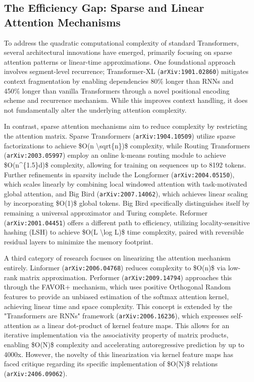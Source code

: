 \documentclass[11pt]{article}
\begin{document}
\subsection{The Efficiency Gap: Sparse and Linear Attention Mechanisms}

To address the quadratic computational complexity of standard Transformers, several architectural innovations have emerged, primarily focusing on sparse attention patterns or linear-time approximations. One foundational approach involves segment-level recurrence; Transformer-XL (\texttt{arXiv:1901.02860}) mitigates context fragmentation by enabling dependencies 80\% longer than RNNs and 450\% longer than vanilla Transformers through a novel positional encoding scheme and recurrence mechanism. While this improves context handling, it does not fundamentally alter the underlying attention complexity.

In contrast, sparse attention mechanisms aim to reduce complexity by restricting the attention matrix. Sparse Transformers (\texttt{arXiv:1904.10509}) utilize sparse factorizations to achieve \$O(n \textbackslash{}sqrt\{n\})\$ complexity, while Routing Transformers (\texttt{arXiv:2003.05997}) employ an online k-means routing module to achieve \$O(n\textasciicircum{}\{1.5\}d)\$ complexity, allowing for training on sequences up to 8192 tokens. Further refinements in sparsity include the Longformer (\texttt{arXiv:2004.05150}), which scales linearly by combining local windowed attention with task-motivated global attention, and Big Bird (\texttt{arXiv:2007.14062}), which achieves linear scaling by incorporating \$O(1)\$ global tokens. Big Bird specifically distinguishes itself by remaining a universal approximator and Turing complete. Reformer (\texttt{arXiv:2001.04451}) offers a different path to efficiency, utilizing locality-sensitive hashing (LSH) to achieve \$O(L \textbackslash{}log L)\$ time complexity, paired with reversible residual layers to minimize the memory footprint.

A third category of research focuses on linearizing the attention mechanism entirely. Linformer (\texttt{arXiv:2006.04768}) reduces complexity to \$O(n)\$ via low-rank matrix approximation. Performer (\texttt{arXiv:2009.14794}) approaches this through the FAVOR+ mechanism, which uses positive Orthogonal Random features to provide an unbiased estimation of the softmax attention kernel, achieving linear time and space complexity. This concept is extended by the "Transformers are RNNs" framework (\texttt{arXiv:2006.16236}), which expresses self-attention as a linear dot-product of kernel feature maps. This allows for an iterative implementation via the associativity property of matrix products, enabling \$O(N)\$ complexity and accelerating autoregressive prediction by up to 4000x. However, the novelty of this linearization via kernel feature maps has faced critique regarding its specific implementation of \$O(N)\$ relations (\texttt{arXiv:2406.09062}).
\end{document}
